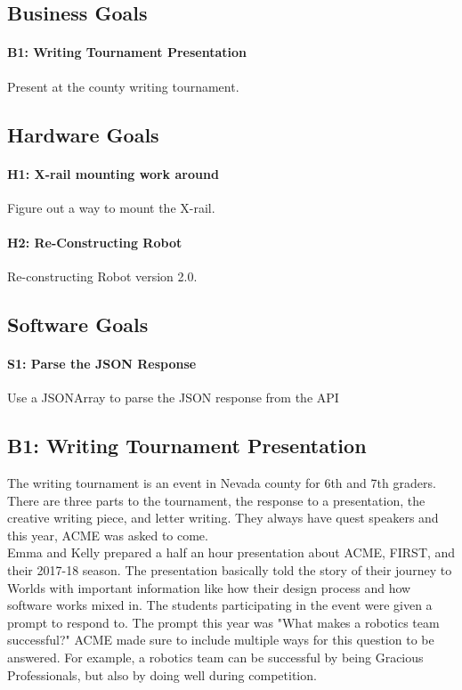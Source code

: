 \documentclass{article}
\begin{document}
\subsection{Business Goals}
\paragraph{B1: Writing Tournament Presentation}
 Present at the county writing tournament.
\subsection{Hardware Goals}
\paragraph{H1: X-rail mounting work around}
 Figure out a way to mount the X-rail.
\paragraph{H2: Re-Constructing Robot}
 Re-constructing Robot version 2.0.
\subsection{Software Goals}
\paragraph{S1: Parse the JSON Response}
 Use a JSONArray to parse the JSON response from the API
\newpage
\subsection{B1: Writing Tournament Presentation}

The writing tournament is an event in Nevada county for 6th and 7th graders. There are three parts to the tournament, the response to a presentation, the creative writing piece, and letter writing. They always have quest speakers and this year, ACME was asked to come. \\

Emma and Kelly prepared a half an hour presentation about ACME, FIRST, and  their 2017-18 season. The presentation basically told the story of their journey to Worlds with important information like how their design process and how software works mixed in. The students participating in the event were given a prompt to respond to. The prompt this year was "What makes a robotics team successful?" ACME made sure to include multiple ways for this question to be answered. For example, a robotics team can be successful by being Gracious Professionals, but also by doing well during competition. \\
\end{document}

